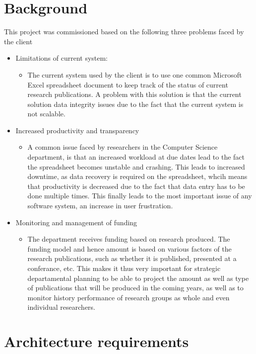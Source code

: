 \documentclass[a4paper,10pt]{article}
\begin{document}
\section{Background}
This project was commissioned based on the following three problems faced by the client
\begin{itemize}
\item Limitations of current system: \\
	\begin{itemize}
	\item The current system used by the client is to use one common Microsoft Excel spreadsheet document to keep track of the status of current research publications. A problem with this solution is that the current solution data integrity issues due to the fact that the current system is not scalable.
	\end{itemize}
\item Increased productivity and transparency
	\begin{itemize}
	\item  A common issue faced by researchers in the Computer Science department, is that an increased workload at due dates lead to the fact the spreadsheet becomes unstable and crashing. This leads to increased downtime, as data recovery is required on the spreadsheet, whcih means that productivity is decreased due to the fact that data entry has to be done multiple times.  This finally leads to the most important issue of any software system, an increase in user frustration.
	\end{itemize}

\item Monitoring and management of funding
	\begin{itemize}
	\item The department receives funding based on research produced. The funding model and hence amount is based on various factors of the research publications, such as whether it is published, presented at a conferance, etc. This makes it thus very important for strategic departamental planning to be able to project the amount as well as type of publications that will be produced in the coming years, as well as to monitor history performance of research groups as whole and even individual researchers.
	\end{itemize}
\end{itemize}

\section{Architecture requirements}
\end{document}
